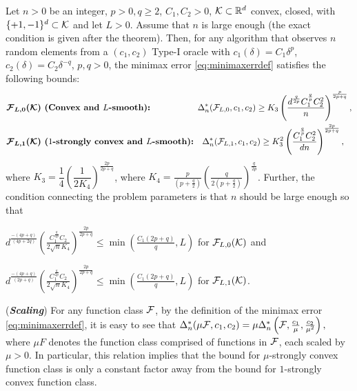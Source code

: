 \begin{theorem}
\label{thm:lb-convex}
Let $n>0$ be an integer, $p>0, q\ge 2$, $C_1,C_2>0$,
$\mathcal{K}\subset \mathbb{R}^d$ convex, closed, with  $\{+1,-1\}^d\subset \mathcal{K}$ and let $L>0$.
Assume that $n$ is large enough (the exact condition is given after the theorem).
Then, for any algorithm that observes $n$ random elements from a $(c_1,c_2)$ Type-I oracle
 with $c_1(\delta) = C_1 \delta^p$, $c_2(\delta) = C_2 \delta^{-q}$, $p,q>0$,
 the minimax error \eqref{eq:minimaxerrdef} satisfies the following bounds:
 \vspace*{-0.1in}
\begin{align*}
&\textbf{$\bm{\mathcal{F}_{L,0}(\mathcal{K})}$ (Convex and $L$-smooth):} \hspace{5.5em} \Delta_n^{*}(\mathcal{F}_{L,0}, c_1,c_2) \ge K_3 \left(\dfrac{d^{\frac{q}{2p}}  C_1^{\frac{q}{p}} C_2^2}{ n}\right)^{\frac{p}{2p+q}},\\
&\textbf{$\bm{\mathcal{F}_{L,1}(\mathcal{K})}$ ($1$-strongly convex and $L$-smooth):} \hspace{1em}
\Delta_n^{*}(\mathcal{F}_{L,1}, c_1,c_2) \ge K_3^2  \left(\dfrac{C_1^{\frac{q}{p}} C_2^2 }{ {d n}}\right)^{\frac{2p}{2p+q}},
\end{align*}
where $K_3 = \dfrac{1}{4}\left(\dfrac{1}{2 K_4}\right)^{\frac{2p}{2p+q}}$, where $K_4 = \frac{p}{(p+\tfrac{q}{2})} \left(\frac{q}{2(p+\tfrac{q}{2})}\right)^{\frac{q}{2p}}$.
Further, the condition connecting the problem parameters is that $n$ should be large enough so that
\begin{inparaenum}[\bfseries (i)]
\item $d^{\frac{-(4p+q)}{(4p+2q)}}\left(\frac{ C_1^{\frac{q}{2p}} C_2 }{2\sqrt{n} K_4} \right)^{\frac{2p}{2p+q}}\le \min\left( \frac{C_1 (2p+q)}{q},  L\right)$  for $\mathcal{F}_{L,0}(\mathcal{K})$ and
\item $d^{\frac{-(4p+q)}{(2p+q)}}\left(\frac{ C_1^{\frac{q}{2p}} C_2}{2\sqrt{n} K_4} \right)^{\frac{2p}{2p+q}} \le \min\left( \frac{C_1 (2p+q)}{q},  L\right)$  for $\mathcal{F}_{L,1}(\mathcal{K})$.
\end{inparaenum}
\end{theorem}
\begin{remark}(\textbf{\textit{Scaling}})
For any function class $\mathcal{F}$, by the definition of the minimax error \eqref{eq:minimaxerrdef}, it is easy to see that
$\Delta_n^*(\mu \mathcal{F}, c_1,c_2) = \mu \Delta_n^*\left(\mathcal{F}, \frac{c_1}{\mu},\frac{c_2}{\mu^2}\right),$
 where $\mu F$ denotes the function class comprised of functions in $\mathcal{F}$, each scaled by $\mu>0$. In particular, this relation implies that the bound for $\mu$-strongly convex function class is only a constant factor away from the bound for $1$-strongly convex function class.
\end{remark}
